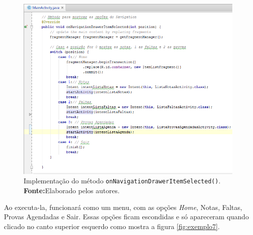 		\begin{figure}[h!]
			\centerline{\includegraphics[scale=0.5]{./imagens/imagem6.png}}
			\caption[Implementação do
			método \texttt{onNavigationDrawerItemSelected()}]{Implementação do
			método \texttt{onNavigationDrawerItemSelected()}.
			 \textbf{Fonte:}Elaborado pelos autores.}
			\label{fig:exemplo6}
		\end{figure}
	
	\par Ao executa-la, funcionará como um menu, com as opções \textit{Home},
Notas, Faltas, Provas Agendadas e Sair. Essas opções ficam escondidas e só apareceram
quando clicado no canto superior esquerdo como mostra a figura
\ref{fig:exemplo7}.
		
